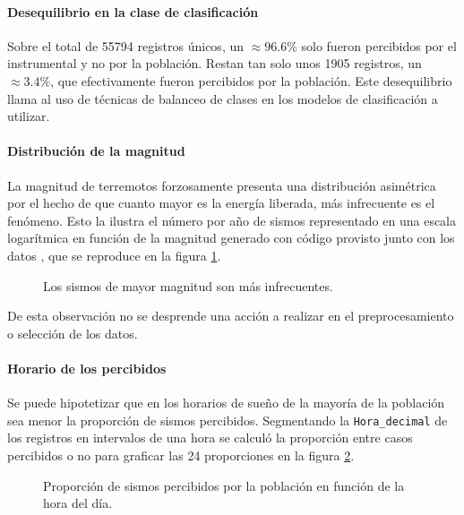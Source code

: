 \documentclass[a4paper]{report}
\begin{document}
\paragraph{Desequilibrio en la clase de clasificación}
Sobre el total de 55794 registros únicos, un \(\approx 96.6\%\) solo fueron percibidos por el instrumental y no por la población.
Restan tan solo unos 1905 registros, un \(\approx 3.4\%\), que efectivamente fueron percibidos por la población.
Este desequilibrio llama al uso de técnicas de balanceo de clases en los modelos de clasificación a utilizar.


\paragraph{Distribución de la magnitud}
La magnitud de terremotos forzosamente presenta una distribución asimétrica por el hecho de que cuanto mayor es la energía liberada, más infrecuente es el fenómeno.
Esto la ilustra el número por año de sismos representado en una escala logarítmica en función de la magnitud generado con código provisto junto con los datos \cite[sección 4.2.1]{daniela_parada_ic-datasets-docencia_nodate}, que se reproduce en la figura \ref{fig:acumulado_anual_magnitud}.


\begin{figure}[!h]
\centering

\caption{Los sismos de mayor magnitud son más infrecuentes.}
\label{fig:acumulado_anual_magnitud}
\end{figure}

De esta observación no se desprende una acción a realizar en el preprocesamiento o selección de los datos.


\paragraph{Horario de los percibidos}
Se puede hipotetizar que en los horarios de sueño de la mayoría de la población sea menor la proporción de sismos percibidos.
Segmentando la \verb'Hora_decimal' de los registros en intervalos de una hora se calculó la proporción entre casos percibidos o no para graficar las 24 proporciones en la figura \ref{fig:histograma_percibidos_por_hora}. 
\begin{figure}[!h]
\centering

\caption{Proporción de sismos percibidos por la población en función de la hora del día.}
\label{fig:histograma_percibidos_por_hora}
\end{figure}
\end{document}
